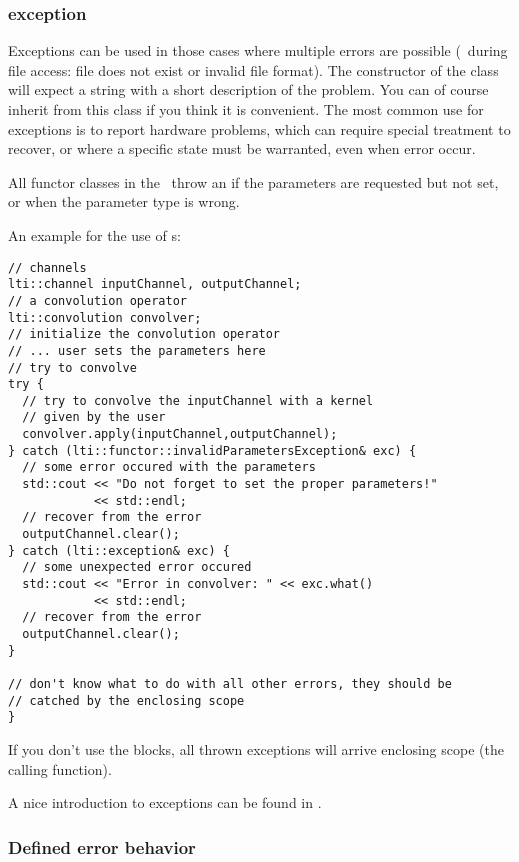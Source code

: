 \subsubsection{exception}
\label{sssec:exception}

Exceptions can be used in those cases where multiple errors are possible (\eg\ during file access:
file does not exist or invalid file format).  The constructor of the class 
will expect a string with a short description of the problem.  You can of course inherit from this
class if you think it is convenient.  The most common use for exceptions is to report hardware
problems, which can require special treatment to recover, or where a specific state must be
warranted, even when error occur.

All functor classes in the \ltilib\ throw an  if the
parameters are requested but not set, or when the parameter type is wrong.

An example for the use of s:

\begin{verbatim}
// channels
lti::channel inputChannel, outputChannel;
// a convolution operator
lti::convolution convolver;
// initialize the convolution operator
// ... user sets the parameters here
// try to convolve
try {
  // try to convolve the inputChannel with a kernel
  // given by the user
  convolver.apply(inputChannel,outputChannel);
} catch (lti::functor::invalidParametersException& exc) {
  // some error occured with the parameters
  std::cout << "Do not forget to set the proper parameters!"
            << std::endl;
  // recover from the error
  outputChannel.clear();
} catch (lti::exception& exc) {
  // some unexpected error occured
  std::cout << "Error in convolver: " << exc.what()
            << std::endl;
  // recover from the error
  outputChannel.clear();
}

// don't know what to do with all other errors, they should be
// catched by the enclosing scope
}
\end{verbatim}

If you don't use the  blocks, all thrown exceptions will
arrive enclosing scope (the calling function).

A nice introduction to exceptions can be found in \cite{stroustrup}.

\subsubsection{Defined error behavior}

